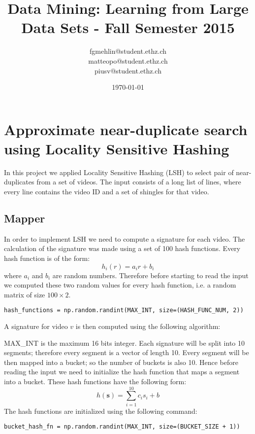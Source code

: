 \documentclass[a4paper, 11pt]{article}
\title{Data Mining: Learning from Large Data Sets - Fall Semester 2015}
\author{fgmehlin@student.ethz.ch\\ matteopo@student.ethz.ch\\ piusv@student.ethz.ch\\}
\date{\today}
\begin{document}
\maketitle

\section{Approximate near-duplicate search using Locality Sensitive Hashing} 
In this project we applied Locality Sensitive Hashing (LSH) to select pair of near-duplicates from a set of videos. The input consists of a long list of lines, where every line contains the video ID and a set of shingles for that video. 
\subsection{Mapper}
In order to implement LSH we need to compute a signature for each video. The calculation of the signature was made using a set of 100 hash functions. Every hash function is of the form:
\begin{equation}
h_i(r) = a_ir + b_i
\end{equation}
where $a_i$ and $b_i$ are random numbers. Therefore before starting to read the input we computed these two random values for every hash function, i.e. a random matrix of size $100\times 2$.
\begin{lstlisting}
hash_functions = np.random.randint(MAX_INT, size=(HASH_FUNC_NUM, 2))
\end{lstlisting}
A signature for video $v$ is then computed using the following algorithm:
\begin{algorithm}
\end{algorithm}

MAX\_INT is the maximum 16 bits integer. Each signature will be split into 10 segments; therefore every segment is a vector of length 10. Every segment will be then mapped into a bucket; so the number of buckets is also 10. Hence before reading the input we need to initialize the hash function that maps a segment into a bucket. These hash functions have the following form:
\begin{equation}
h(\textbf{s}) = \sum_{i = 1}^{10} c_is_i + b
\end{equation}
The hash functions are initialized using the following command:
\begin{lstlisting}
bucket_hash_fn = np.random.randint(MAX_INT, size=(BUCKET_SIZE + 1))
\end{lstlisting}
\end{document}
